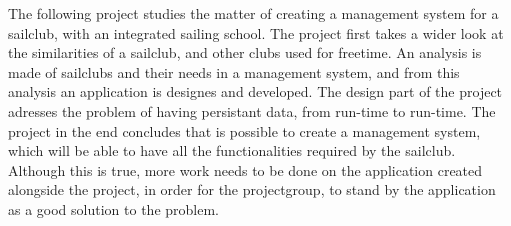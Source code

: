 
The following project studies the matter of creating a management system for a sailclub, with an integrated sailing school.
The project first takes a wider look at the similarities of a sailclub, and other clubs used for freetime.
An analysis is made of sailclubs and their needs in a management system, and from this analysis an application is designes and developed. 
The design part of the project adresses the problem of having persistant data, from run-time to run-time. 
The project in the end concludes that is possible to create a management system, which will be able to have all the functionalities required by the sailclub. 
Although this is true, more work needs to be done on the application created alongside the project, in order for the projectgroup, to stand by the application as a good solution to the problem.